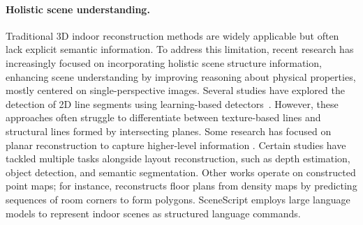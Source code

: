 \paragraph{Holistic scene understanding.}
Traditional 3D indoor reconstruction methods are widely applicable but often lack explicit semantic information. To address this limitation, recent research has increasingly focused on incorporating holistic scene structure information, enhancing scene understanding by improving reasoning about physical properties, mostly centered on single-perspective images. Several studies have explored the detection of 2D line segments using learning-based detectors~\citep{zhou2019end, pautrat2021sold2, dai2022fully}. However, these approaches often struggle to differentiate between texture-based lines and structural lines formed by intersecting planes. Some research has focused on planar reconstruction to capture higher-level information \citep{liu2018planenet,yu2019single,liu2019planercnn}. Certain studies \citep{huang2018holistic,nie2020total3dunderstanding,sun2021hohonet} have tackled multiple tasks alongside layout reconstruction, such as depth estimation, object detection, and semantic segmentation.
Other works operate on constructed point maps; for instance, \cite{yue2023connecting}  reconstructs floor plans from density maps by predicting sequences of room corners to form polygons. SceneScript \citep{avetisyan2024scenescript} employs large language models to represent indoor scenes as structured language commands.


